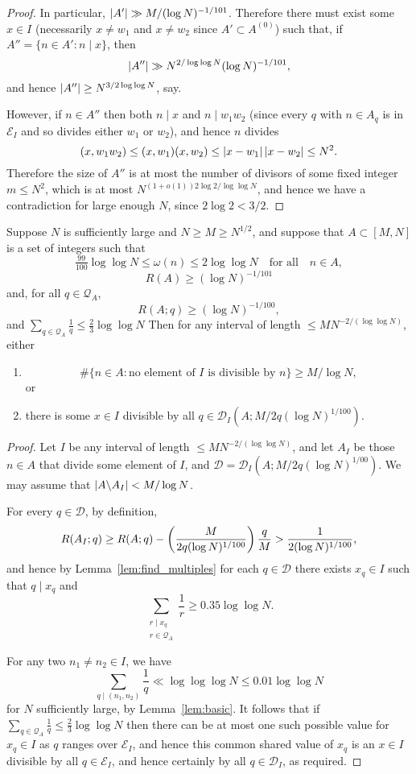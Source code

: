 \begin{proof}
  In particular, $\left\lvert A'\right\rvert\gg M/(\log N)^{-1/101}$. Therefore there must exist some $x\in I$ (necessarily $x\neq w_1$ and $x\neq w_2$ since $A'\subset A^{(0)}$) such that, if $A''=\{ n\in A' : n\mid x\}$, then
  \[\left\lvert A''\right\rvert\gg N^{2/\log\log N}(\log N)^{-1/101},\]
  and hence $\left\lvert A''\right\rvert\geq N^{3/2\log\log N}$, say.

  However, if $n\in A''$ then both $n\mid x$ and $n\mid w_1w_2$ (since every $q$ with $n\in A_q$ is in $\mathcal{E}_I$ and so divides either $w_1$ or $w_2$), and hence $n$ divides
  \[(x,w_1w_2)\leq (x,w_1)(x,w_2)\leq \left\lvert x-w_1\right\rvert\left\lvert x-w_2\right\rvert\leq N^2.\]
  Therefore the size of $A''$ is at most the number of divisors of some fixed integer $m\leq N^2$, which is at most $N^{(1+o(1))2\log 2/\log\log N}$, and hence we have a contradiction for large enough $N$, since $2\log 2< 3/2$.
\end{proof}

\begin{proposition}\label{prop:tech_iterative2}
Suppose $N$ is sufficiently large and $N\geq M\geq N^{1/2}$, and suppose that $A\subset [M,N]$ is a set of integers such that
\[\tfrac{99}{100}\log\log N\leq \omega(n)\leq  2\log\log N\quad\textrm{for all}\quad n\in A,\]
\[R(A)\geq (\log N)^{-1/101}\]
and, for all $q\in \mathcal{Q}_A$,
\[R(A;q) \geq (\log N)^{-1/100},\]
and $\sum_{q\in\mathcal{Q}_A}\frac{1}{q}\leq \frac{2}{3}\log\log N$
Then for any interval of length $\leq MN^{-2/(\log \log N)}$, either
\begin{enumerate}
\item \[\# \{ n\in A : \textrm{no element of }I\textrm{ is divisible by }n\}\geq M/\log N,\]
or
\item there is some $x\in I$ divisible by all $q\in\mathcal{D}_I(A;M/2q(\log N)^{1/100})$.
\end{enumerate}
\end{proposition}
\begin{proof}

Let $I$ be any interval of length $\leq MN^{-2/(\log\log N)}$, and let $A_I$ be those $n\in A$ that divide some element of $I$, and $\mathcal{D}=\mathcal{D}_I(A;M/2q(\log N)^{1/00})$. We may assume that $\left\lvert A\backslash A_I\right\rvert< M/\log N$.

For every $q\in \mathcal{D}$, by definition,
  \[R(A_I; q) \geq R(A;q) - \left( \frac{M}{2q(\log N)^{1/100}}\right)\frac{q}{M}>\frac{1}{2(\log N)^{1/100}},\]
and hence by Lemma~\ref{lem:find_multiples} for each $q\in\mathcal{D}$ there exists $x_q\in I$ such that $q\mid x_q$ and
\[\sum_{\substack{r\mid x_q\\ r\in \mathcal{Q}_A}}\frac{1}{r}\geq 0.35\log\log N.\]

 For any two $n_1\neq n_2\in I$, we have
  \[\sum_{q\mid (n_1,n_2)}\frac{1}{q}\ll \log\log\log N\leq 0.01\log\log N\]
  for $N$ sufficiently large, by Lemma~\ref{lem:basic}.  It follows that if $\sum_{q\in\mathcal{Q}_A}\frac{1}{q}\leq \frac{2}{3}\log\log N$ then there can be at most one such possible value for $x_q\in I$ as $q$ ranges over $\mathcal{E}_I$, and hence this common shared value of $x_q$ is an $x\in I$ divisible by all $q\in\mathcal{E}_I$, and hence certainly by all $q\in\mathcal{D}_I$, as required.
  \end{proof}

